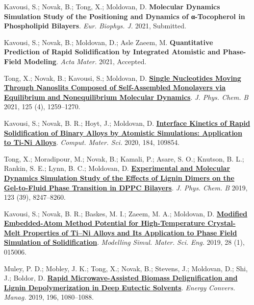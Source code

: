 \pagebreak


\begin{cventries}
  \cventry
    {} %
    {} %
    {} %
    {} %
    {
      \begin{cvitems} %
        \item {Kavousi, S.; Novak, B.; Tong, X.; Moldovan, D. \textbf{Molecular Dynamics Simulation Study of the Positioning and Dynamics of α-Tocopherol in Phospholipid Bilayers}. \textit{Eur. Biophys. J.} 2021, Submitted.}
        \item {Kavousi, S.; Novak, B.; Moldovan, D.; Asle Zaeem, M. \textbf{Quantitative Prediction of Rapid Solidification by Integrated Atomistic and Phase-Field Modeling}. \textit{Acta Mater.} 2021, Accepted.}
        \item {Tong, X.; Novak, B.; Kavousi, S.; Moldovan, D. \href{https://doi.org/10.1021/acs.jpcb.0c07797}{\textbf{Single Nucleotides Moving Through Nanoslits Composed of Self-Assembled Monolayers via Equilibrium and Nonequilibrium Molecular Dynamics}}. \textit{J. Phys. Chem. B} 2021, 125 (4), 1259–1270.}
        \item {Kavousi, S.; Novak, B. R.; Hoyt, J.; Moldovan, D. \href{https://doi.org/10.1016/j.commatsci.2020.109854.}{\textbf{Interface Kinetics of Rapid Solidification of Binary Alloys by Atomistic Simulations: Application to Ti-Ni Alloys}}. \textit{Comput. Mater. Sci.} 2020, 184, 109854.}
        \item {Tong, X.; Moradipour, M.; Novak, B.; Kamali, P.; Asare, S. O.; Knutson, B. L.; Rankin, S. E.; Lynn, B. C.; Moldovan, D. \href{https://doi.org/10.1021/acs.jpcb.9b05525}{\textbf{Experimental and Molecular Dynamics Simulation Study of the Effects of Lignin Dimers on the Gel-to-Fluid Phase Transition in DPPC Bilayers}}. \textit{J. Phys. Chem. B} 2019, 123 (39), 8247–8260.}
        \item {Kavousi, S.; Novak, B. R.; Baskes, M. I.; Zaeem, M. A.; Moldovan, D. \href{https://doi.org/10.1088/1361-651X/ab580c}{\textbf{Modified Embedded-Atom Method Potential for High-Temperature Crystal-Melt Properties of Ti–Ni Alloys and Its Application to Phase Field Simulation of Solidification}}. \textit{Modelling Simul. Mater. Sci. Eng.} 2019, 28 (1), 015006.}
        \item {Muley, P. D.; Mobley, J. K.; Tong, X.; Novak, B.; Stevens, J.; Moldovan, D.; Shi, J.; Boldor, D. \href{https://doi.org/10.1016/j.enconman.2019.06.070}{\textbf{Rapid Microwave-Assisted Biomass Delignification and Lignin Depolymerization in Deep Eutectic Solvents}}. \textit{Energy Convers. Manag.} 2019, 196, 1080–1088.}

\end{cvitems}}
\end{cventries}
